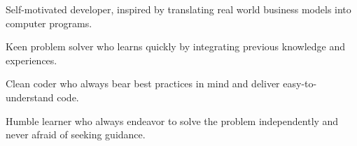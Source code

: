

\begin{cvlist}
	\item Self-motivated developer, inspired by translating real world business models into computer programs.
	\item Keen problem solver who learns quickly by integrating previous knowledge and experiences.
	\item Clean coder who always bear best practices in mind and deliver easy-to-understand code.
	\item Humble learner who always endeavor to solve the problem independently and never afraid of seeking guidance. 
\end{cvlist}

